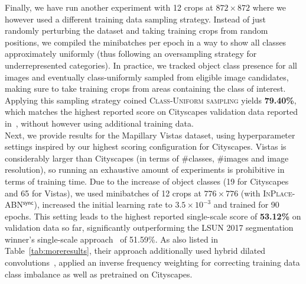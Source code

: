 \documentclass[10pt,twocolumn,letterpaper]{article}
\newcommand{\bnInplaceSync}{\textsc{InPlace-ABN$^{\mathsf{sync}}$}\xspace}
\begin{document}
Finally, we have run another experiment with 12 crops at $872\times872$ where we however used a different training data sampling strategy. Instead of just randomly perturbing the dataset and taking training crops from random positions, we compiled the minibatches per epoch in a way to show all classes approximately uniformly (thus following an oversampling strategy for underrepresented categories). %
In practice, we tracked object class presence for all images and eventually class-uniformly sampled from eligible image candidates, making sure to take training crops from areas containing the class of interest. Applying this sampling strategy coined \textsc{Class-Uniform sampling} yields \textbf{79.40\%}, which matches the highest reported score on Cityscapes validation data reported in~\cite{Gadde2017}, without however using additional training data.\\
Next, we provide results for the Mapillary Vistas dataset, using hyperparameter settings inspired by our highest scoring configuration for Cityscapes. Vistas is considerably larger than Cityscapes (in terms of \#classes, \#images and image resolution), so running an exhaustive amount of experiments is prohibitive in terms of training time. Due to the increase of object classes (19 for Cityscapes and 65 for Vistas), we used minibatches of 12 crops at $776\times776$ (with \bnInplaceSync), increased the initial learning rate to $3.5\times 10^{-3}$ and trained for 90 epochs. This setting leads to the highest reported single-scale score of \textbf{53.12\%} on validation data so far, significantly outperforming the LSUN 2017 segmentation winner's single-scale approach~\cite{LSUNSeg17} of 51.59\%. As also listed in Table~\ref{tab:moreresults}, their approach additionally used hybrid dilated convolutions~\cite{Wang2017}, applied an inverse frequency weighting for correcting training data class imbalance as well as pretrained on Cityscapes.
\end{document}
